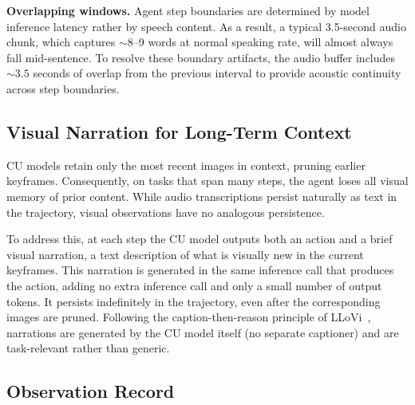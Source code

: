 \documentclass[11pt]{article}
\begin{document}
\textbf{Overlapping windows.}
Agent step boundaries are determined by model inference latency rather by speech content.
As a result, a typical 3.5-second audio chunk, which captures ${\sim}8$--9 words at normal speaking rate, will almost always fall mid-sentence.
To resolve these boundary artifacts, the audio buffer includes ${\sim}3.5$ seconds of overlap from the previous interval to provide acoustic continuity across step boundaries.

\subsection{Visual Narration for Long-Term Context}
\label{sec:narration}

CU models retain only the most recent images in context, pruning earlier keyframes.
Consequently, on tasks that span many steps, the agent loses all visual memory of prior content.
While audio transcriptions persist naturally as text in the trajectory, visual observations have no analogous persistence.

To address this, at each step the CU model outputs both an action and a brief visual narration, a text description of what is visually new in the current keyframes.
This narration is generated in the same inference call that produces the action, adding no extra inference call and only a small number of output tokens. It persists indefinitely in the trajectory, even after the corresponding images are pruned.
Following the caption-then-reason principle of LLoVi~\citep{llovi}, narrations are generated by the CU model itself (no separate captioner) and are task-relevant rather than generic.

\subsection{Observation Record}
\label{sec:obsrecord}
\end{document}

